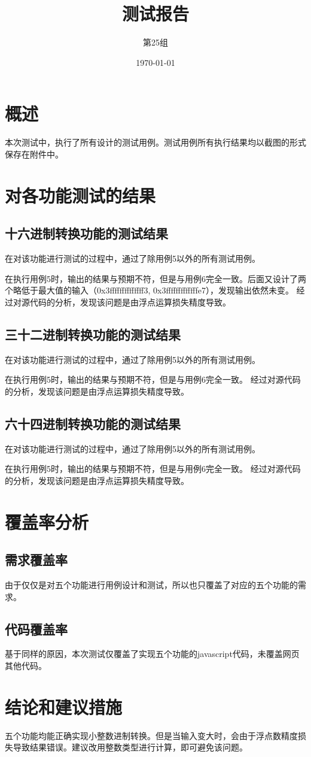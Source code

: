 \documentclass[12pt, a4paper, oneside]{ctexart}
\title{\textbf{测试报告}}
\author{第25组}
\date{\today}
\begin{document}
\maketitle

\section{概述}
本次测试中，执行了所有设计的测试用例。测试用例所有执行结果均以截图的形式保存在附件中。

\section{对各功能测试的结果}
\subsection{十六进制转换功能的测试结果}
在对该功能进行测试的过程中，通过了除用例5以外的所有测试用例。

在执行用例5时，输出的结果与预期不符，但是与用例6完全一致。后面又设计了两个略低于最大值的输入（0x3ffffffffffffff3, 0x3fffffffffffffe7），发现输出依然未变。
经过对源代码的分析，发现该问题是由浮点运算损失精度导致。
\subsection{三十二进制转换功能的测试结果}
在对该功能进行测试的过程中，通过了除用例5以外的所有测试用例。

在执行用例5时，输出的结果与预期不符，但是与用例6完全一致。
经过对源代码的分析，发现该问题是由浮点运算损失精度导致。
\subsection{六十四进制转换功能的测试结果}
在对该功能进行测试的过程中，通过了除用例5以外的所有测试用例。

在执行用例5时，输出的结果与预期不符，但是与用例6完全一致。
经过对源代码的分析，发现该问题是由浮点运算损失精度导致。


\section{覆盖率分析}
\subsection{需求覆盖率}
由于仅仅是对五个功能进行用例设计和测试，所以也只覆盖了对应的五个功能的需求。

\subsection{代码覆盖率}
基于同样的原因，本次测试仅覆盖了实现五个功能的javascript代码，未覆盖网页其他代码。

\section{结论和建议措施}
五个功能均能正确实现小整数进制转换。但是当输入变大时，会由于浮点数精度损失导致结果错误。建议改用整数类型进行计算，即可避免该问题。
\end{document}
